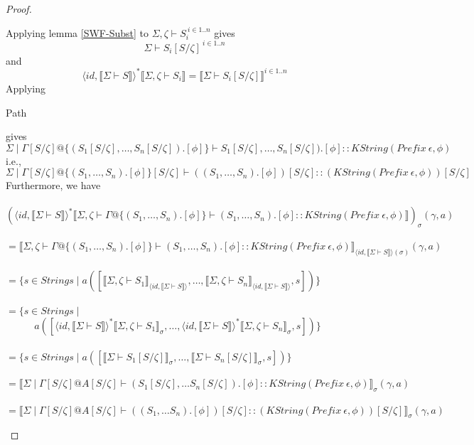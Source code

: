 \documentclass{article}
\newcommand{\sem}[1]{\llbracket #1 \rrbracket}
\begin{document}
\begin{proof}
\begin{description}
Applying lemma \ref{SWF-Subst} to $\Sigma,\zeta \vdash S_i^{~i \in 1..n}$ gives $$\Sigma \vdash S_i[S/\zeta]^{~i \in 1..n}$$ and $$\langle \mathit{id}, \sem{\Sigma \vdash S} \rangle^* \sem{\Sigma, \zeta \vdash S_i} = \sem{\Sigma \vdash S_i[S/\zeta]}^{i \in 1..n}$$ 
Applying \begin{sc}Path\end{sc} gives 
$$\Sigma \mid \Gamma[S/\zeta] @ \{ (S_1[S/\zeta],\ldots,S_n[S/\zeta]).[\phi] \} \vdash S_1[S/\zeta],\ldots,S_n[S/\zeta]).[\phi] :: \mathit{KString}(\mathit{Prefix}~\epsilon,\phi)$$
i.e.,
$$\Sigma \mid \Gamma[S/\zeta] @ \{ (S_1,\ldots,S_n).[\phi] \}[S/\zeta] \vdash ((S_1,\ldots,S_n).[\phi])[S/\zeta] :: (\mathit{KString}(\mathit{Prefix}~\epsilon,\phi))[S/\zeta]$$
Furthermore, we have\\~\\
$(\langle \mathit{id}, \sem{\Sigma \vdash S} \rangle^* \sem{\Sigma,\zeta \vdash \Gamma @ \{ (S_1, \ldots, S_n).[\phi] \} \vdash (S_1, \ldots, S_n).[\phi] :: \mathit{KString(\mathit{Prefix}~\epsilon,\phi)} })_{\sigma}(\gamma,a)$\\~\\
$= \sem{\Sigma,\zeta \vdash \Gamma @ \{ (S_1, \ldots, S_n).[\phi] \} \vdash (S_1, \ldots, S_n).[\phi] :: \mathit{KString(\mathit{Prefix}~\epsilon,\phi)}}_{\langle \mathit{id}, \sem{\Sigma \vdash S} \rangle(\sigma)}(\gamma,a)$\\~\\
$= \{ s \in \mathit{Strings} \mid a([\sem{\Sigma,\zeta \vdash S_1}_{\langle \mathit{id}, \sem{\Sigma \vdash S} \rangle}, \ldots, \sem{\Sigma,\zeta \vdash S_n}_{\langle \mathit{id}, \sem{\Sigma \vdash S} \rangle}, s])\}$\\~\\
$= \{ s \in \mathit{Strings} \mid$ \\
$~~~~~~~~~~~~~a([\langle \mathit{id}, \sem{\Sigma \vdash S} \rangle^*\sem{\Sigma,\zeta \vdash S_1}_\sigma, \ldots, \langle \mathit{id}, \sem{\Sigma \vdash S} \rangle^*\sem{\Sigma,\zeta \vdash S_n}_\sigma, s])\}$\\~\\
$= \{ s \in \mathit{Strings} \mid a([\sem{\Sigma \vdash S_1[S/\zeta]}_\sigma, \ldots, \sem{\Sigma \vdash S_n[S/\zeta]}_\sigma, s])\}$\\~\\
$= \sem{\Sigma \mid \Gamma[S/\zeta] @ A[S/\zeta] \vdash (S_1[S/\zeta], \ldots S_n[S/\zeta]).[\phi] :: \mathit{KString}(\mathit{Prefix}~\epsilon,\phi)}_{\sigma}(\gamma, a)$\\~\\
$= \sem{\Sigma \mid \Gamma[S/\zeta] @ A[S/\zeta] \vdash ((S_1, \ldots S_n).[\phi])[S/\zeta] :: (\mathit{KString}(\mathit{Prefix}~\epsilon,\phi))[S/\zeta]}_\sigma(\gamma,a)$



\end{description}
\end{proof}
\end{document}
